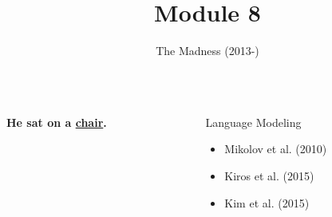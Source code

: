 \makeatother
\title{Module 8}
\subtitle{The Madness (2013-)}
\author{}
\institute{}
\date{}

\begin{frame}
\end{frame}

\begin{frame}
	\begin{columns}
		\begin{column}{0.6\textwidth}
			\begin{overlayarea}{\textwidth}{\textheight}
				\vspace{0.2in}
				\hspace{1cm}\textbf{He sat on a \underline{chair}.}
			\end{overlayarea}
		\end{column}

		\begin{column}{0.4\textwidth}
			\begin{overlayarea}{\textwidth}{\textheight}

				\begin{block}{Language Modeling}
					\begin{itemize}
						\item Mikolov et al. (2010) \cite{DBLP:conf/interspeech/MikolovKBCK10}
						\item Kiros et al. (2015) \cite{DBLP:conf/nips/KirosZSZUTF15}
						\item Kim et al. (2015) \cite{DBLP:journals/corr/KimJSR15}
					\end{itemize}
				\end{block}
			\end{overlayarea}
		\end{column}

	\end{columns}
\end{frame}

